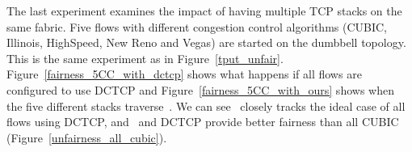 The last experiment examines the impact of having multiple TCP stacks on the same fabric. 
Five flows with different congestion control algorithms (CUBIC, Illinois, HighSpeed, New Reno and Vegas) are started
on the dumbbell topology. This is the same experiment as in Figure~\ref{tput_unfair}.
Figure~\ref{fairness_5CC_with_dctcp} shows what happens if all
flows are configured to use DCTCP and Figure~\ref{fairness_5CC_with_ours} shows when
the five different stacks traverse~\acdc{}. We can see~\acdc{} closely tracks the ideal case of
all flows using DCTCP, and~\acdc{} and DCTCP provide better fairness than all CUBIC (Figure~\ref{unfairness_all_cubic}).


